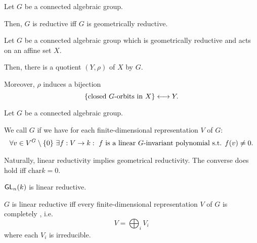 \begin{theorem}
	Let $G$ be a connected algebraic group. 
	
	Then, $G$ is reductive iff $G$ is geometrically reductive.
\end{theorem}

\begin{theorem}
	Let $G$ be a connected algebraic group which is geometrically reductive and acts on an affine set $X$.
	
	Then, there is a quotient $(Y, \rho)$ of $X$ by $G$.
	
	Moreover, $\rho$ induces a bijection
	\[ \left\lbrace \text{closed }G\text{-orbits in }X \right\rbrace \longleftrightarrow Y. \]
\end{theorem}

\begin{definition}
	Let $G$ be a connected algebraic group.
	
	We call $G$  if we have for each finite-dimensional representation $V$ of $G$:
	\begin{align*}
	\forall v \in V^G\setminus \{0\} ~ \exists f : V \overset{}{\rightarrow} k :~ f \text{ is a linear }G\text{-invariant polynomial s.t. }f(v) \neq 0.
	\end{align*}
\end{definition}

\begin{remark}
	Naturally, linear reductivity implies geometrical reductivity.
	The converse does hold iff $\mathrm{char} k = 0$.
\end{remark}

\begin{remark}
	$\textsf{GL}_n(k)$ is linear reductive.
\end{remark}
\begin{remark}
	$G$ is linear reductive iff every finite-dimensional representation $V$ of $G$ is completely , i.e.
	\[ V = \bigoplus_i V_i \]
	where each $V_i$ is irreducible.
\end{remark}